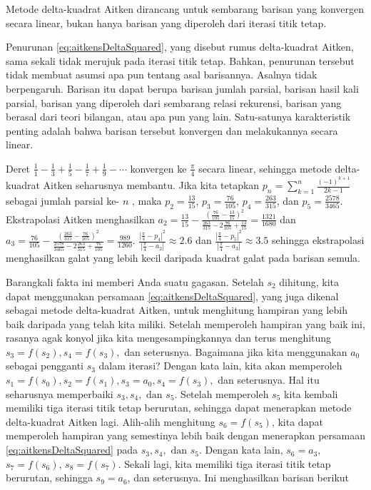 \begin{digression}{Metode delta-kuadrat Aitken dirancang untuk sembarang barisan yang konvergen secara linear, bukan hanya barisan yang diperoleh dari iterasi titik tetap.}

\noindent Penurunan \ref{eq:aitkensDeltaSquared}, yang disebut rumus
delta-kuadrat Aitken, sama sekali tidak merujuk pada iterasi titik
tetap. Bahkan, penurunan tersebut tidak membuat asumsi apa pun tentang
asal barisannya. Asalnya tidak berpengaruh. Barisan itu dapat berupa
barisan jumlah parsial, barisan hasil kali parsial, barisan yang diperoleh
dari sembarang relasi rekurensi, barisan yang berasal dari teori bilangan,
atau apa pun yang lain. Satu-satunya karakteristik penting adalah
bahwa barisan tersebut konvergen dan melakukannya secara linear.

Deret $\frac{1}{1}-\frac{1}{3}+\frac{1}{5}-\frac{1}{7}+\frac{1}{9}-\cdots$
konvergen ke $\frac{\pi}{4}$ secara linear, sehingga metode delta-kuadrat
Aitken seharusnya membantu. Jika kita tetapkan $p_{n}=\sum_{k=1}^{n}\frac{(-1)^{k+1}}{2k-1}$
sebagai jumlah parsial ke- $n$ , maka $p_{2}=\frac{13}{15}$, $p_{3}=\frac{76}{105}$,
$p_{4}=\frac{263}{315}$, dan $p_{5}=\frac{2578}{3465}$. Ekstrapolasi
Aitken menghasilkan $a_{2}=\frac{13}{15}-\frac{(\frac{76}{105}-\frac{13}{15})^{2}}{\frac{263}{315}-2\frac{76}{105}+\frac{13}{15}}=\frac{1321}{1680}$
dan $a_{3}=\frac{76}{105}-\frac{(\frac{263}{315}-\frac{76}{105})^{2}}{\frac{2578}{3465}-2\frac{263}{315}+\frac{76}{105}}=\frac{989}{1260}$.
$\frac{|\frac{\pi}{4}-p_{4}|^{2}}{|\frac{\pi}{4}-a_{2}|}\approx2.6$
dan $\frac{|\frac{\pi}{4}-p_{5}|^{2}}{|\frac{\pi}{4}-a_{3}|}\approx3.5$
sehingga ekstrapolasi menghasilkan galat yang lebih kecil daripada
kuadrat galat pada barisan semula.

\end{digression}

Barangkali fakta ini memberi Anda suatu gagasan. Setelah $s_{2}$
dihitung, kita dapat menggunakan persamaan \ref{eq:aitkensDeltaSquared},
yang juga dikenal sebagai metode
delta-kuadrat Aitken, untuk menghitung hampiran yang lebih baik daripada
yang telah kita miliki. Setelah memperoleh hampiran yang baik ini,
rasanya agak konyol jika kita mengesampingkannya dan terus menghitung
$s_{3}=f(s_{2}),s_{4}=f(s_{3}),$ dan seterusnya. Bagaimana jika kita
menggunakan $a_{0}$ sebagai pengganti $s_{3}$ dalam iterasi? Dengan
kata lain, kita akan memperoleh $s_{1}=f(s_{0}),s_{2}=f(s_{1}),s_{3}=a_{0},s_{4}=f(s_{3}),$
dan seterusnya. Hal itu seharusnya memperbaiki $s_{3},s_{4},\mbox{ dan }s_{5}$.
Setelah memperoleh $s_{5}$ kita kembali memiliki tiga iterasi titik
tetap berurutan, sehingga dapat menerapkan metode delta-kuadrat Aitken
lagi. Alih-alih menghitung $s_{6}=f(s_{5})$, kita dapat memperoleh
hampiran yang semestinya lebih baik dengan menerapkan persamaan \ref{eq:aitkensDeltaSquared}
pada $s_{3},s_{4},\mbox{ dan }s_{5}$. Dengan kata lain, $s_{6}=a_{3}$,
$s_{7}=f(s_{6})$, $s_{8}=f(s_{7})$. Sekali lagi, kita memiliki tiga
iterasi titik tetap berurutan, sehingga $s_{9}=a_{6}$, dan seterusnya.
Ini menghasilkan barisan berikut

